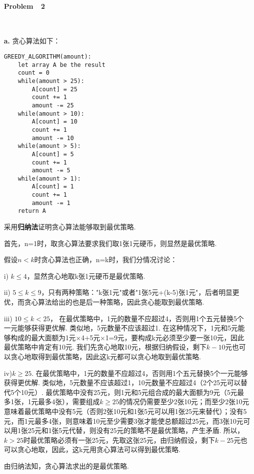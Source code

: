 \documentclass[UTF8]{ctexart}
\begin{document}
\paragraph*{Problem\ \ 2}\ \par
\textbf{a.} 
贪心算法如下：
\begin{lstlisting}
GREEDY_ALGORITHM(amount):
    let array A be the result
    count = 0 
    while(amount > 25):
        A[count] = 25
        count += 1
        amount -= 25
    while(amount > 10):
        A[count] = 10
        count += 1
        amount -= 10
    while(amount > 5):
        A[count] = 5
        count += 1
        amount -= 5
    while(amount > 1):
        A[count] = 1
        count += 1
        amount -= 1
    return A
\end{lstlisting}
采用\textbf{归纳法}证明贪心算法能够取到最优策略. \par
首先，n=1时，取贪心算法要求我们取1张1元硬币，则显然是最优策略.\par
假设$n<k$时贪心算法也正确，n=k时，我们分情况讨论：\par
i) $k\leq 4$，显然贪心地取k张1元硬币是最优策略.\par
ii) $5\leq k\leq 9$，只有两种策略："k张1元"或者"1张5元+(k-5)张1元"，后者明显更优，而贪心算法给出的也是后一种策略，因此贪心能取到最优策略.\par
iii) $10\leq k< 25$， 在最优策略中，1元的数量不应超过4，否则用1个五元替换5个一元能够获得更优解. 类似地，5元数量不应该超过1. 在这种情况下，1元和5元能够构成的最大面额为1元$\times$4+5元$\times$1=9元，要构成k元必须至少要一张10元，因此最优策略中肯定有10元. 我们先贪心地取10元，根据归纳假设，剩下$k-10$元也可以贪心地取得到最优策略，因此这k元都可以贪心地取到最优策略.
\par iv)$k\geq 25$. 在最优策略中，1元的数量不应超过4，否则用1个五元替换5个一元能够获得更优解. 类似地，5元数量不应该超过1，10元数量不应超过4（2个25元可以替代5个10元）. 最优策略中没有25元，则1元和5元组合成的最大面额为9元（5元最多1张，1元最多4张），需要组成$k\geq 25$的情况仍需要至少2张10元；而至少2张10元意味着最优策略中没有5元（否则2张10元和1张5元可以用1张25元来替代）；没有5元，而1元最多4张，则意味着10元至少需要3张才能使总额超过25元，而3张10元可以用1张25元和1张5元代替，则没有25元的策略不是最优策略，产生矛盾. 所以，$k>25$时最优策略必须有一张25元，先取这张25元，由归纳假设，剩下$k-25$元也可以贪心地取，因此，这k元用贪心算法可以得到最优策略. \par
由归纳法知，贪心算法求出的是最优策略.\par\ \ \par 
\end{document}
